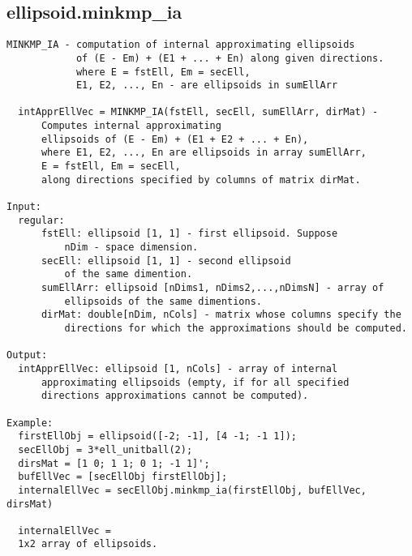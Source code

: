 \subsection{\texorpdfstring{ellipsoid.minkmp\_ia}{minkmp\_ia}}\label{method:ellipsoid.minkmpia}
\begin{verbatim}
MINKMP_IA - computation of internal approximating ellipsoids
            of (E - Em) + (E1 + ... + En) along given directions.
            where E = fstEll, Em = secEll,
            E1, E2, ..., En - are ellipsoids in sumEllArr

  intApprEllVec = MINKMP_IA(fstEll, secEll, sumEllArr, dirMat) -
      Computes internal approximating
      ellipsoids of (E - Em) + (E1 + E2 + ... + En),
      where E1, E2, ..., En are ellipsoids in array sumEllArr,
      E = fstEll, Em = secEll,
      along directions specified by columns of matrix dirMat.

Input:
  regular:
      fstEll: ellipsoid [1, 1] - first ellipsoid. Suppose
          nDim - space dimension.
      secEll: ellipsoid [1, 1] - second ellipsoid
          of the same dimention.
      sumEllArr: ellipsoid [nDims1, nDims2,...,nDimsN] - array of
          ellipsoids of the same dimentions.
      dirMat: double[nDim, nCols] - matrix whose columns specify the
          directions for which the approximations should be computed.

Output:
  intApprEllVec: ellipsoid [1, nCols] - array of internal
      approximating ellipsoids (empty, if for all specified
      directions approximations cannot be computed).

Example:
  firstEllObj = ellipsoid([-2; -1], [4 -1; -1 1]);
  secEllObj = 3*ell_unitball(2);
  dirsMat = [1 0; 1 1; 0 1; -1 1]';
  bufEllVec = [secEllObj firstEllObj];
  internalEllVec = secEllObj.minkmp_ia(firstEllObj, bufEllVec, dirsMat)

  internalEllVec =
  1x2 array of ellipsoids.
\end{verbatim}
